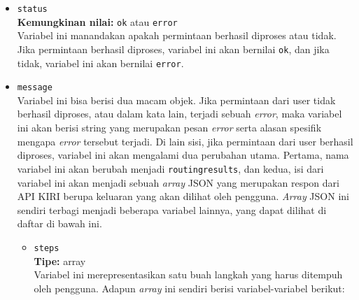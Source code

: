 \begin{itemize}
	\item \verb|status|\\
	\textbf{Kemungkinan nilai:} \verb|ok| atau \verb|error|\\
	Variabel ini manandakan apakah permintaan berhasil diproses atau tidak. Jika permintaan berhasil diproses, variabel ini akan bernilai \verb|ok|, dan jika tidak, variabel ini akan bernilai \verb|error|.
	\item \verb|message|\\
	Variabel ini bisa berisi dua macam objek. Jika permintaan dari user tidak berhasil diproses, atau dalam kata lain, terjadi sebuah \textit{error}, maka variabel ini akan berisi string yang merupakan pesan \textit{error} serta alasan spesifik mengapa \textit{error} tersebut terjadi. Di lain sisi, jika permintaan dari user berhasil diproses, variabel ini akan mengalami dua perubahan utama. Pertama, nama variabel ini akan berubah menjadi \verb|routingresults|, dan kedua, isi dari variabel ini akan menjadi sebuah \textit{array} JSON yang merupakan respon dari API KIRI berupa keluaran yang akan dilihat oleh pengguna. \textit{Array} JSON ini sendiri terbagi menjadi beberapa variabel lainnya, yang dapat dilihat di daftar di bawah ini.
	
	\begin{itemize}
		\item \verb|steps|\\
		\textbf{Tipe:} array\\
		Variabel ini merepresentasikan satu buah langkah yang harus ditempuh oleh pengguna. Adapun \textit{array} ini sendiri berisi variabel-variabel berikut:
		

\end{itemize}
\end{itemize}
